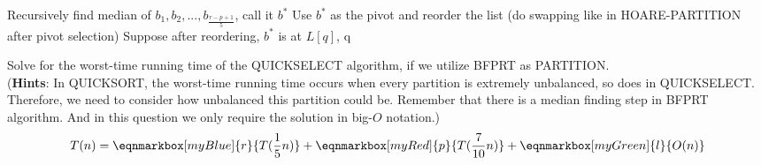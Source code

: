 \begin{enumerate}
\begin{algorithmic}
        \State Recursively find median of $b_1, b_2, . . . , b_{\frac{r-p+1}{5}}$, call it $b^*$ 
        \State Use $b^*$ as the pivot and reorder the list (do swapping like in HOARE-PARTITION after pivot selection) 
        \State Suppose after reordering, $b^*$ is at $L[q]$, \Return q
\end{algorithmic}
Solve for the worst-time running time of the QUICKSELECT algorithm, if we utilize BFPRT as PARTITION. \\
(\textbf{Hints}: In QUICKSORT, the worst-time running time occurs when every partition is extremely unbalanced, so does in QUICKSELECT. Therefore, we need to consider how unbalanced this partition could be. Remember that there is a median finding step in BFPRT algorithm. And in this question we only require the solution in big-$O$ notation.) \\
\vspace{\baselineskip}
\begin{equation*}
    T(n) = \eqnmarkbox[myBlue]{r}{T(\frac{1}{5} n)} + \eqnmarkbox[myRed]{p}{T(\frac{7}{10} n)} + \eqnmarkbox[myGreen]{l}{O(n)}
\vspace{1.5\baselineskip}
\end{equation*}

\end{enumerate}
